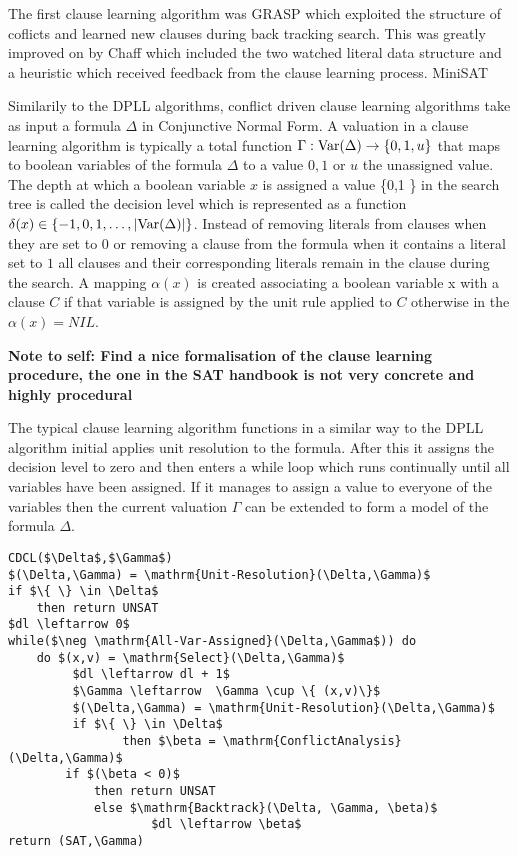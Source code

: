 The first clause learning algorithm was GRASP \cite{MS99,MS96} which exploited the structure of coflicts and learned new clauses during back tracking search. This was greatly improved on by Chaff \cite{LZ01} which included the two watched literal data structure and a heuristic which received feedback from the clause learning process. MiniSAT

Similarily to the DPLL algorithms, conflict driven clause learning algorithms take as input a formula $\Delta$ in Conjunctive Normal Form. 
A valuation in a clause learning algorithm is typically a total function $\Gamma : \mathrm{Var}(\Delta) \to \{0,1,u\}$ that maps to boolean variables of the formula $\Delta$ to a value $0,1$ or $u$ the unassigned value. The depth at which a boolean variable $x$ is assigned a value \{0,1 \} in the search tree is called the decision level which is represented as a function $\delta(x) \in \{-1,0,1, \ldots, |\mathrm{Var}(\Delta)| \} $. Instead of removing literals from clauses when they are set to $0$ or removing a clause from the formula when it contains a literal set to $1$ all clauses and their corresponding literals remain in the clause during the search. A mapping $\alpha(x)$ is created associating a boolean variable x with a clause $C$ if that variable is assigned by the unit rule applied to $C$ otherwise in the $\alpha(x) = NIL$.

\textbf{Note to self: Find a nice formalisation of the clause learning procedure, the one in the SAT handbook is not very concrete and highly procedural}



The typical clause learning algorithm functions in a similar way to the DPLL algorithm initial applies unit resolution to the formula. After this it assigns the decision level to zero and then enters a while loop which runs continually until all variables have been assigned. If it manages to assign a value to everyone of the variables then the current valuation $\Gamma$ can be extended to form a model of the formula $\Delta$.




\begin{lstlisting}[caption = Example CDCL Algorithm, mathescape]
CDCL($\Delta$,$\Gamma$)
$(\Delta,\Gamma) = \mathrm{Unit-Resolution}(\Delta,\Gamma)$
if $\{ \} \in \Delta$
	then return UNSAT
$dl \leftarrow 0$
while($\neg \mathrm{All-Var-Assigned}(\Delta,\Gamma$)) do
	do $(x,v) = \mathrm{Select}(\Delta,\Gamma)$
 	     $dl \leftarrow dl + 1$
 	     $\Gamma \leftarrow  \Gamma \cup \{ (x,v)\}$
	     $(\Delta,\Gamma) = \mathrm{Unit-Resolution}(\Delta,\Gamma)$
	     if $\{ \} \in \Delta$
              	then $\beta = \mathrm{ConflictAnalysis}(\Delta,\Gamma)$
		if $(\beta < 0)$
			then return UNSAT
			else $\mathrm{Backtrack}(\Delta, \Gamma, \beta)$
			        $dl \leftarrow \beta$
return (SAT,\Gamma)
\end{lstlisting}



